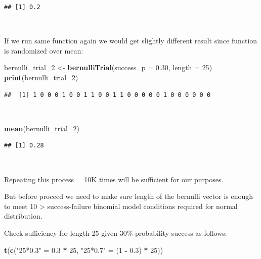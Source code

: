 \documentclass[]{article}
\newenvironment{Shaded}{\begin{snugshade}}{\end{snugshade}}
\newcommand{\DataTypeTok}[1]{\textcolor[rgb]{0.13,0.29,0.53}{#1}}
\newcommand{\DecValTok}[1]{\textcolor[rgb]{0.00,0.00,0.81}{#1}}
\newcommand{\FloatTok}[1]{\textcolor[rgb]{0.00,0.00,0.81}{#1}}
\newcommand{\KeywordTok}[1]{\textcolor[rgb]{0.13,0.29,0.53}{\textbf{#1}}}
\newcommand{\NormalTok}[1]{#1}
\newcommand{\OperatorTok}[1]{\textcolor[rgb]{0.81,0.36,0.00}{\textbf{#1}}}
\newcommand{\StringTok}[1]{\textcolor[rgb]{0.31,0.60,0.02}{#1}}
\begin{document}
\begin{verbatim}
## [1] 0.2
\end{verbatim}

~

If we run same function again we would get slightly different result
since function is randomized over mean:

\begin{Shaded}
\begin{Highlighting}[]
\NormalTok{bernulli_trial_}\DecValTok{2}\NormalTok{ <-}\StringTok{ }\KeywordTok{bernulliTrial}\NormalTok{(}\DataTypeTok{success_p =} \FloatTok{0.30}\NormalTok{, }\DataTypeTok{length =} \DecValTok{25}\NormalTok{)}
\KeywordTok{print}\NormalTok{(bernulli_trial_}\DecValTok{2}\NormalTok{)}
\end{Highlighting}
\end{Shaded}

\begin{verbatim}
##  [1] 1 0 0 0 1 0 0 1 1 0 0 1 1 0 0 0 0 0 1 0 0 0 0 0 0
\end{verbatim}

~

\begin{Shaded}
\begin{Highlighting}[]
\KeywordTok{mean}\NormalTok{(bernulli_trial_}\DecValTok{2}\NormalTok{)}
\end{Highlighting}
\end{Shaded}

\begin{verbatim}
## [1] 0.28
\end{verbatim}

~

Repeating this process = 10K times will be sufficient for our purposes.

But before proceed we need to make sure length of the bernulli vector is
enough to meet 10 \textgreater{} success-failure binomial model
conditions required for normal distribution.

Check sufficiency for length 25 given 30\% probability success as
follows:

\begin{Shaded}
\begin{Highlighting}[]
\KeywordTok{t}\NormalTok{(}\KeywordTok{c}\NormalTok{(}\StringTok{"25*0.3"}\NormalTok{ =}\StringTok{ }\FloatTok{0.3} \OperatorTok{*}\StringTok{ }\DecValTok{25}\NormalTok{, }\StringTok{"25*0.7"}\NormalTok{ =}\StringTok{ }\NormalTok{(}\DecValTok{1} \OperatorTok{-}\StringTok{ }\FloatTok{0.3}\NormalTok{) }\OperatorTok{*}\StringTok{ }\DecValTok{25}\NormalTok{))}
\end{Highlighting}
\end{Shaded}
\end{document}
